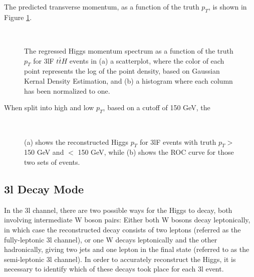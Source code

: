 The predicted transverse momentum, as a function of the truth $p_T$, is shown in Figure \ref{fig:pt3lFresults}.
                                                                                                                             
\begin{figure}[H]
    \centering
    \\                     
    \caption{The regressed Higgs momentum spectrum as a function of the truth $p_T$ for 3lF $t\bar{t}H$ events in (a) a scatterplot, where the color of each point represents the log of the point density, based on Gaussian Kernal Density Estimation, and (b) a histogram where each column  has been normalized to one.}
    \label{fig:pt3lFresults}
\end{figure}

When split into high and low $p_T$, based on a cutoff of 150 GeV, the 

\begin{figure}[H]                                                                                                           
    \centering
    \\
    \caption{(a) shows the reconstructed Higgs $p_T$ for 3lF events with truth $p_T > $ 150 GeV and $<$ 150 GeV, while (b) shows the ROC curve for those two sets of events.}
    \label{fig:pt3lFroc}
\end{figure}

\subsection{3l Decay Mode}
\label{sec:decay3l}

In the 3l channel, there are two possible ways for the Higgs to decay, both involving intermediate W boson pairs: Either both W bosons decay leptonically, in which case the reconstructed decay consists of two leptons (referred as the fully-leptonic 3l channel), or one W decays leptonically and the other hadronically, giving two jets and one lepton in the final state (referred to as the semi-leptonic 3l channel). In order to accurately reconstruct the Higgs, it is necessary to identify which of these decays took place for each 3l event.

